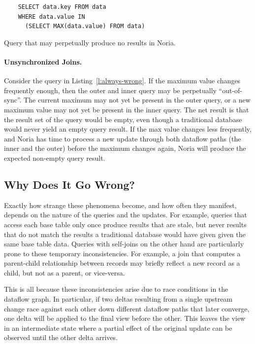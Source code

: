 \begin{listing}[h]
  \begin{verbatim}
    SELECT data.key FROM data
    WHERE data.value IN
      (SELECT MAX(data.value) FROM data)
  \end{verbatim}
  \caption{Query that may perpetually produce no results in Noria.}
  \label{l:always-wrong}
\end{listing}

\paragraph{Unsynchronized Joins.}
Consider the query in Listing~\vref{l:always-wrong}. If the maximum value
changes frequently enough, then the outer and inner query may be perpetually
``out-of-sync''. The current maximum may not yet be present in the outer query,
or a new maximum value may not yet be present in the inner query. The net result
is that the result set of the query would be empty, even though a traditional
database would never yield an empty query result. If the max value changes less
frequently, and Noria has time to process a new update through both dataflow
paths (the inner and the outer) before the maximum changes again, Noria will
produce the expected non-empty query result.

\subsection{Why Does It Go Wrong?}

Exactly how strange these phenomena become, and how often they manifest, depends
on the nature of the queries and the updates. For example, queries that access
each base table only once produce results that are stale, but never results that
do not match the results a traditional database would have given given the same
base table data. Queries with self-joins on the other hand are particularly
prone to these temporary inconsistencies. For example, a join that computes a
parent-child relationship between records may briefly reflect a new record as a
child, but not as a parent, or vice-versa.

This is all because these inconsistencies arise due to race conditions in the
dataflow graph. In particular, if two deltas resulting from a single upstream
change race against each other down different dataflow paths that later
converge, one delta will be applied to the final view before the other. This
leaves the view in an intermediate state where a partial effect of the original
update can be observed until the other delta arrives.

